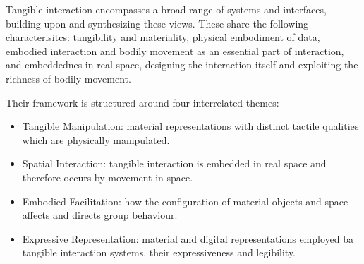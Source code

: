 Tangible interaction encompasses a broad range of systems and interfaces, building upon and synthesizing these views. These share the following characterisitcs: tangibility and materiality, physical embodiment of data, embodied interaction and bodily movement as an essential part of interaction, and embeddednes in real space, designing the interaction itself and exploiting the richness of bodily movement.

Their framework is structured around four interrelated themes:
\begin{itemize}
\item Tangible Manipulation:  material representations with distinct tactile qualities which are physically manipulated.
\item Spatial Interaction: tangible interaction is embedded in real space and therefore occurs by movement in space.
\item Embodied Facilitation: how the configuration of material objects and space affects and directs group behaviour.
\item Expressive Representation: material and digital representations employed ba tangible interaction systems, their expressiveness and legibility.
\end{itemize}




